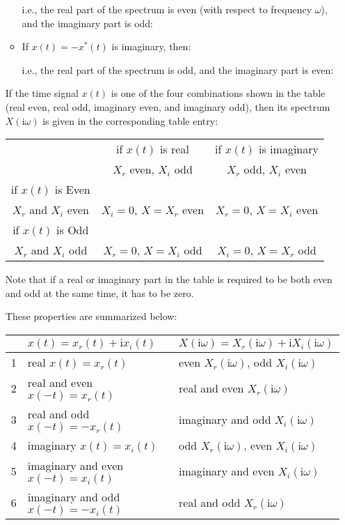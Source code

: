 \begin{itemize}
\begin{itemize}
	i.e., the real part of the spectrum is even (with respect to frequency $\omega$), and the imaginary part is odd:
	
	\item If $x(t)=-x^*(t)$ is imaginary, then:
	
	i.e., the real part of the spectrum is odd, and the imaginary part is even:
	
	\end{itemize}
	
	If the time signal $x(t)$ is one of the four combinations shown in the table (real even, real odd, imaginary even, and imaginary odd), then its spectrum $X(\mathrm{i}\omega)$ is given in the corresponding table entry:
	\vskip0.2in
	\begin{table}[H]
		\centering
		\begin{tabular}{c||c|c} \hline
			& if $x(t)$ is real		& if $x(t)$ is imaginary	\\ 
			& $X_r$ even, $X_i$ odd	& $X_r$ odd, $X_i$ even \\ \hline \hline
		if $x(t)$ is Even	&			&		\\
		$X_r$ and $X_i$ even	& $X_i=0$, $X=X_r$ even & $X_r=0$, $X=X_i$ even	\\ \hline
		if $x(t)$ is Odd	& 			&		\\
		$X_r$ and $X_i$ odd	& $X_r=0$, $X=X_i$ odd	& $X_i=0$, $X=X_r$ odd	\\ \hline
		\end{tabular}
	\end{table}
	Note that if a real or imaginary part in the table is required to be both even 
	and odd at the same time, it has to be zero.
	
	These properties are summarized below:
	\vskip 0.1in
	\begin{table}[H]
		\centering
		\begin{tabular}{l|l|l} \hline
		  & $x(t)=x_r(t)+\mathrm{i}x_i(t)$	& $X(\mathrm{i}\omega)=X_r(\mathrm{i}\omega)+\mathrm{i}X_i(\mathrm{i}\omega)$	\\ \hline
		1 & real $x(t)=x_r(t)$ 		& even $X_r(\mathrm{i}\omega)$, odd $X_i(\mathrm{i}\omega)$ \\
		2 & real and even $x(-t)=x_r(t)$ 	& real and even $X_r(\mathrm{i}\omega)$ \\
		3 & real and odd $x(-t)=-x_r(t)$ 	& imaginary and odd $X_i(\mathrm{i}\omega)$ \\
		4 & imaginary $x(t)=x_i(t)$  	& odd $X_r(\mathrm{i}\omega)$, even $X_i(\mathrm{i}\omega)$ \\ 
		5 & imaginary and even $x(-t)=x_i(t)$ 	& imaginary and even $X_i(\mathrm{i}\omega)$ \\
		6 & imaginary and odd $x(-t)=-x_i(t)$ 	& real and odd $X_r(\mathrm{i}\omega)$ \\ \hline
		\end{tabular}
	\end{table}
	

\end{itemize}
